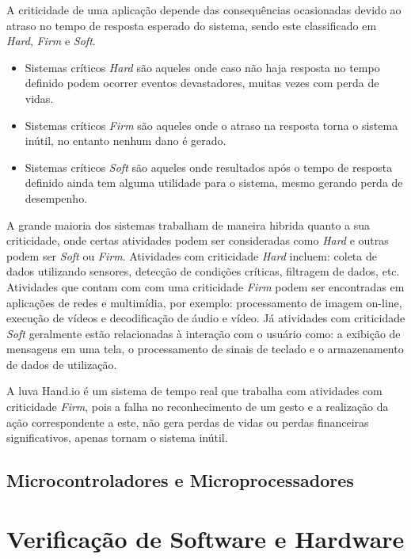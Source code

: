 A criticidade de uma aplicação depende das consequências ocasionadas devido ao atraso no tempo de resposta esperado do sistema, sendo este classificado em \textit{Hard}, \textit{Firm} e \textit{Soft}.
\begin{itemize}
\item Sistemas críticos \textit{Hard} são aqueles onde caso não haja resposta no tempo definido podem ocorrer eventos devastadores, muitas vezes com perda de vidas.
\item Sistemas críticos \textit{Firm} são aqueles onde o atraso na resposta torna o sistema inútil, no entanto nenhum dano é gerado.
\item Sistemas críticos \textit{Soft} são aqueles onde resultados após o tempo de resposta definido ainda tem alguma utilidade para o sistema, mesmo gerando perda de desempenho.
\end{itemize}

A grande maioria dos sistemas trabalham de maneira hibrida quanto a sua criticidade, onde certas atividades podem ser consideradas como \textit{Hard} e outras podem ser \textit{Soft} ou \textit{Firm}. Atividades com criticidade \textit{Hard} incluem: coleta de dados utilizando sensores, detecção de condições críticas, filtragem de dados, etc. Atividades que contam com com uma criticidade \textit{Firm} podem ser encontradas em aplicações de redes e multimídia, por exemplo: processamento de imagem on-line, execução de vídeos e decodificação de áudio e vídeo. Já atividades com criticidade \textit{Soft} geralmente estão relacionadas à interação com o usuário como: a exibição de mensagens em uma tela, o processamento de sinais de teclado e o armazenamento de dados de utilização.

A luva Hand.io é um sistema de tempo real que trabalha com atividades com criticidade \textit{Firm}, pois a falha no reconhecimento de um gesto e a realização da ação correspondente a este, não gera perdas de vidas ou perdas financeiras significativos, apenas tornam o sistema inútil.


\subsection{Microcontroladores e Microprocessadores}



\section{Verificação de Software e Hardware}
